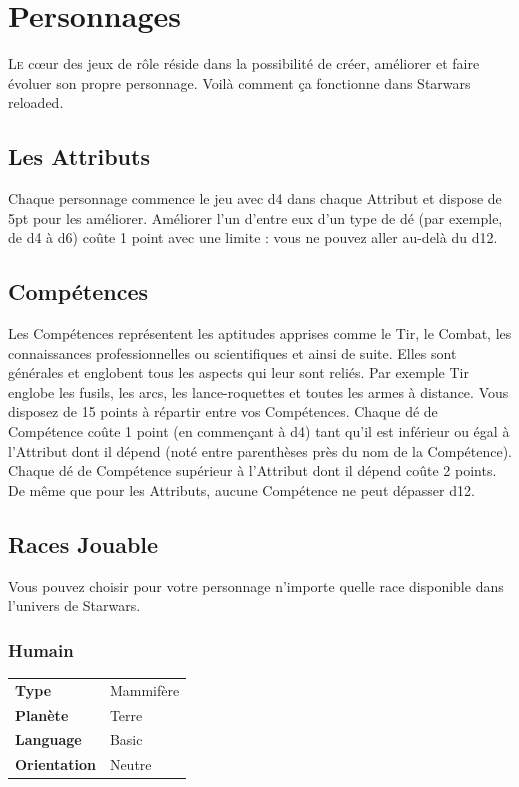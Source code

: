 
\section{Personnages}
\lettrine{L}{e} c\oe{}ur des jeux de rôle réside dans la possibilité de créer, améliorer et faire évoluer son propre personnage. Voilà comment ça fonctionne dans {\jedifont Starwars reloaded}. 

\subsection{Les Attributs}
Chaque personnage commence le jeu avec d4 dans chaque Attribut et dispose de 5pt pour les améliorer. Améliorer l'un d'entre eux d’un type de dé (par exemple, de d4 à d6) coûte 1 point avec une limite : vous ne pouvez aller au-delà du d12.

\subsection{Compétences}
Les Compétences représentent les aptitudes apprises comme le Tir, le Combat, les connaissances professionnelles ou scientifiques et ainsi de suite. Elles sont générales et englobent tous les aspects qui leur sont reliés. Par exemple Tir englobe les fusils, les arcs, les lance-roquettes et toutes les armes à distance. Vous disposez de 15 points à répartir entre vos Compétences. Chaque dé de Compétence coûte 1 point (en commençant à d4) tant qu’il est inférieur ou égal à l’Attribut dont il dépend (noté entre parenthèses près du nom de la Compétence). Chaque dé de Compétence supérieur à l’Attribut dont il dépend coûte 2 points. De même que pour les Attributs, aucune Compétence ne peut dépasser d12.

\subsection{Races Jouable}
Vous pouvez choisir pour votre personnage n’importe quelle race disponible dans l'univers de Starwars. 

\subsubsection{Humain}
\begin{flushright}
\begin{tabular}{ l l }
	\textbf{Type} 			& Mammifère \\
   	\textbf{Planète} 		& Terre \\
   	\textbf{Language} 		& Basic \\
   	\textbf{Orientation} 	& Neutre \\
\end{tabular}
\vspace{-60}
\end{flushright}


